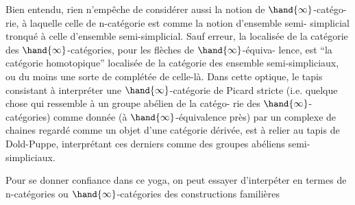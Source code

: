 Bien entendu, rien n'empêche de considérer aussi la notion de $\hand{\infty}$-catégo-%
rie, à laquelle celle de n-catégorie est comme la notion d'ensemble semi-
simplicial tronqué à celle d'ensemble semi-simplicial. Sauf erreur, la
localisée de la catégorie des $\hand{\infty}$-catégories, pour les flèches de $\hand{\infty}$-équiva-%
lence, est  ``la catégorie homotopique''\hand{,} localisée de la catégorie des ensemble
semi-simpliciaux, ou du moins une sorte de complétée de celle-là. Dans
cette optique, le tapis consistant à interpréter une $\hand{\infty}$-catégorie de Picard
stricte (i.e. quelque chose qui ressemble à un groupe abélien de la catégo-%
rie des $\hand{\infty}$-catégories) comme donnée (à $\hand{\infty}$-équivalence près) par un 
complexe de chaines regardé comme un objet d'une catégorie dérivée, est à
relier au tapis de Dold-Puppe, interprétant ces derniers comme des groupes
abéliens semi-simpliciaux.

Pour se donner confiance dans ce yoga, on peut essayer d'interpéter
en termes de n-catégories  ou $\hand{\infty}$-catégories des constructions familières

